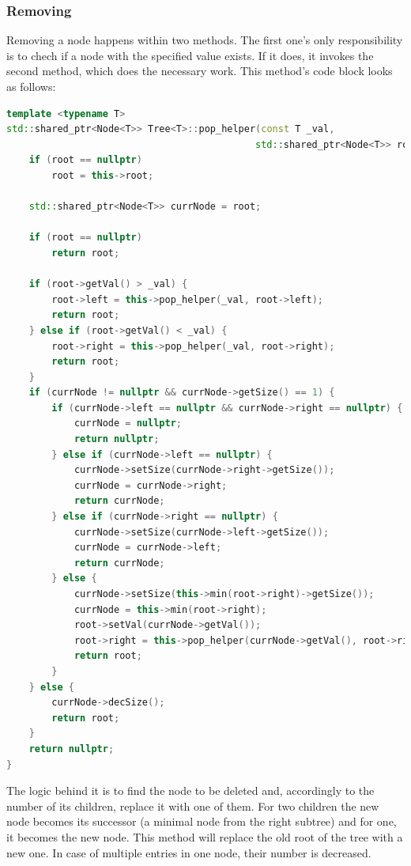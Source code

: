 \documentclass[12pt]{article}
\begin{document}
\subsubsection{Removing}
Removing a node happens within two methods. The first one's only responsibility is to chech if a node with the specified value exists. If it does, it invokes the second method, which does the necessary work. This method's code block looks as follows:
\begin{footnotesize}
\begin{lstlisting}[language=C++]
template <typename T>
std::shared_ptr<Node<T>> Tree<T>::pop_helper(const T _val, 
                                            std::shared_ptr<Node<T>> root) {
    if (root == nullptr)
        root = this->root;

    std::shared_ptr<Node<T>> currNode = root;

    if (root == nullptr)
        return root;

    if (root->getVal() > _val) {
        root->left = this->pop_helper(_val, root->left);
        return root;
    } else if (root->getVal() < _val) {
        root->right = this->pop_helper(_val, root->right); 
        return root;
    }
    if (currNode != nullptr && currNode->getSize() == 1) {
        if (currNode->left == nullptr && currNode->right == nullptr) {
            currNode = nullptr;
            return nullptr;
        } else if (currNode->left == nullptr) {
            currNode->setSize(currNode->right->getSize()); 
            currNode = currNode->right;                    
            return currNode;
        } else if (currNode->right == nullptr) {
            currNode->setSize(currNode->left->getSize());
            currNode = currNode->left; 
            return currNode;
        } else { 
            currNode->setSize(this->min(root->right)->getSize());
            currNode = this->min(root->right);
            root->setVal(currNode->getVal());
            root->right = this->pop_helper(currNode->getVal(), root->right); 
            return root;
        }
    } else {
        currNode->decSize();
        return root;
    }
    return nullptr;
}
\end{lstlisting}
\end{footnotesize}
\pagebreak

The logic behind it is to find the node to be deleted and, accordingly to the number of its children, replace it with one of them. For two children the new node becomes its successor (a minimal node from the right subtree) and for one, it becomes the new node. This method will replace the old root of the tree with a new one. In case of multiple entries in one node, their number is decreased.
\end{document}
